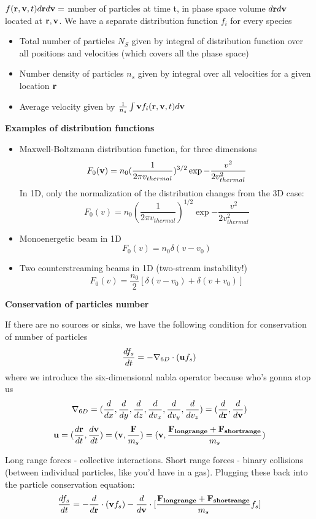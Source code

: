 $f(\mathbf{r}, \mathbf{v}, t) d\mathbf{r} d\mathbf{v} = $ number of particles at time t, in phase space volume $d\mathbf{r} d\mathbf{v}$ located at $\mathbf{r}, \mathbf{v}$. We have a separate distribution function $f_i$ for every species
\begin{itemize}
\item Total number of particles $N_S$ given by integral of distribution function over all positions and velocities (which covers all the phase space)
\item Number density of particles $n_s$ given by integral over all velocities for a given location $\mathbf{r}$ 
\item Average velocity given by $\frac{1}{n_s} \int \mathbf{v} f_i(\mathbf{r}, \mathbf{v}, t)  d\mathbf{v}$
\end{itemize}
\par \textbf{Examples of distribution functions}
\begin{itemize}
	\item Maxwell-Boltzmann distribution function, for three dimensions
	\[ F_0(\mathbf{v}) = n_0 (\frac{1}{2 \pi v_{thermal}})^{3/2} \exp{-\frac{v^2}{2 v_{thermal}^2}} \] %
	In 1D, only the normalization of the distribution changes from the 3D case:
	\[ F_0(v) = n_0 (\frac{1}{2 \pi v_{thermal}})^{1/2} \exp{-\frac{v^2}{2 v_{thermal}^2}} \]
	\item Monoenergetic beam in 1D
	\[ F_0(v) = n_0 \delta (v-v_0) \]
	\item Two counterstreaming beams in 1D (two-stream instability!)
	\[ F_0(v) = \frac{n_0}{2} [\delta (v-v_0) + \delta(v+v_0)] \]
\end{itemize}

\textbf{Conservation of particles number}

If there are no sources or sinks, we have the following condition for conservation of number of particles
\[ \frac{d f_s}{d t} = -\nabla_{6D} \cdot (\mathbf{u} f_s) \]
where we introduce the six-dimensional nabla operator because who's gonna stop us
\[ \nabla_{6D} = ( \frac{d }{d x},\frac{d }{d y},\frac{d }{d z},\frac{d }{d v_x},\frac{d }{d v_y},\frac{d }{d v_z}) = (\frac{d }{d \mathbf{r}}, \frac{d }{d \mathbf{v}}) \]
\[ \mathbf{u} = (\frac{d \mathbf{r}}{d t}, \frac{d \mathbf{v}}{d t}) = (\mathbf{v}, \frac{\mathbf{F}}{m_s}) = (\mathbf{v}, \frac{\mathbf{F_{long range}} + \mathbf{F_{short range}}}{m_s}) \] %

Long range forces - collective interactions. Short range forces - binary collisions (between individual particles, like you'd have in a gas).
Plugging these back into the particle conservation equation:
\[ \frac{d f_s}{d t} = -\frac{d }{d \mathbf{r}} \cdot (\mathbf{v} f_s) - \frac{d }{d \mathbf{v}} \cdot [\frac{\mathbf{F_{long range}} + \mathbf{F_{short range}}}{m_s} f_s] \]

